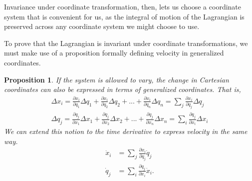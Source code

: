 \documentclass[10pt, psamsfonts]{amsart}
\newtheorem{prop}[thm]{Proposition}
\theoremstyle{definition}
\theoremstyle{remark}
\numberwithin{equation}{section}
\begin{document}
Invariance under coordinate transformation, then, lets us choose a coordinate system that is convenient for us, as the integral of motion of the Lagrangian is preserved across any coordinate system we might choose to use.

To prove that the Lagrangian is invariant under coordinate transformations, we must make use of a proposition formally defining velocity in generalized coordinates.
\begin{prop}
If the system is allowed to vary, the change in Cartesian coordinates can also be expressed in terms of generalized coordinates. That is,
\begin{gather*}
  \Delta x_i = \frac{\partial x_i}{\partial q_1}\Delta q_1 + \frac{\partial x_i}{\partial q_2}\Delta q_2 + ... + \frac{\partial x_i}{\partial q_n}\Delta q_n =  \sum_j \frac{\partial x_i}{\partial q_j} \Delta q_j \\
  \Delta q_j = \frac{\partial q_j}{\partial x_1} \Delta x_1 + \frac{\partial q_j}{\partial x_2} \Delta x_2 + ... + \frac{\partial q_j}{\partial x_n} \Delta x_n = \sum_i \frac{\partial q_j}{\partial x_i} \Delta x_i
\end{gather*}
We can extend this notion to the time derivative to express velocity in the same way.
\begin{align*}
  \dot{x}_i &= \sum_j \frac{\partial x_i}{\partial q_j} \dot{q}_j\\
  \dot{q}_j &= \sum_i \frac{\partial q_j}{\partial x_i} \dot{x}_i.
\end{align*}
\end{prop}
\end{document}
